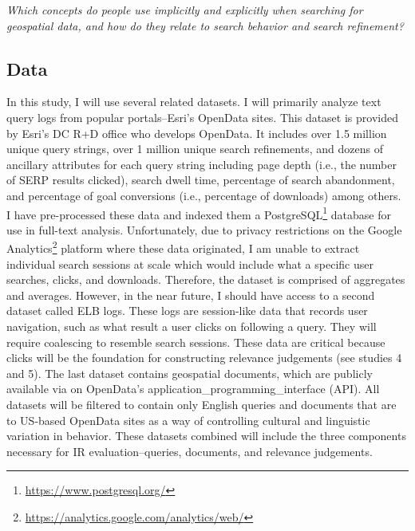 \emph{Which concepts do people use implicitly and explicitly when searching for geospatial data, and how do they relate to search behavior and search refinement?}

\subsection{Data}
In this study, I will use several related datasets. I will primarily analyze text query logs from popular portals–Esri’s OpenData sites. This dataset is provided by Esri’s DC R+D office who develops OpenData. It includes over 1.5 million unique query strings, over 1 million unique search refinements, and dozens of ancillary attributes for each query string including page depth (i.e., the number of SERP results clicked), search dwell time, percentage of search abandonment, and percentage of goal conversions (i.e., percentage of downloads) among others. I have pre-processed these data and indexed them a PostgreSQL\footnote{\url{https://www.postgresql.org/}} database for use in full-text analysis. Unfortunately, due to privacy restrictions on the Google Analytics\footnote{\url{https://analytics.google.com/analytics/web/}} platform where these data originated, I am unable to extract individual search sessions at scale which would include what a specific user searches, clicks, and downloads. Therefore, the dataset is comprised of aggregates and averages. However, in the near future, I should have access to a second dataset called ELB logs. These logs are session-like data that records user navigation, such as what result a user clicks on following a query. They will require coalescing to resemble search sessions. These data are critical because clicks will be the foundation for constructing relevance judgements (see studies 4 and 5). The last dataset contains geospatial documents, which are publicly available via on OpenData’s \gls{application_programming_interface} (\acrshort{API}). All datasets will be filtered to contain only English queries and documents that are to US-based OpenData sites as a way of controlling cultural and linguistic variation in behavior. These datasets combined will include the three components necessary for IR evaluation–queries, documents, and relevance judgements.

